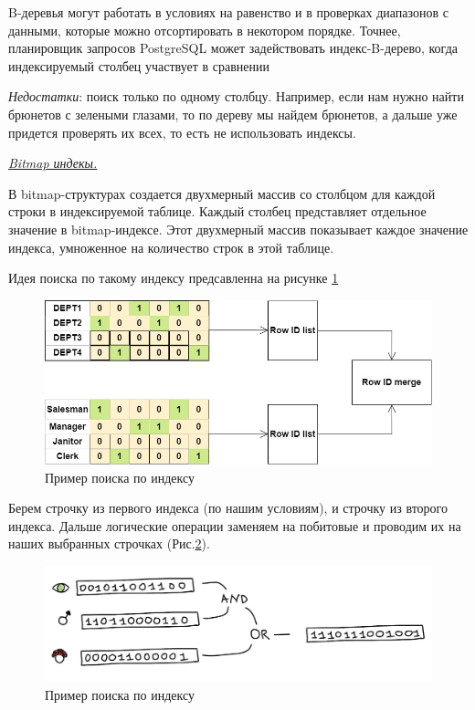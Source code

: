 B-деревья могут работать в условиях на равенство и в проверках диапазонов с данными, которые можно отсортировать в некотором порядке. Точнее, планировщик запросов PostgreSQL может задействовать индекс-B-дерево, когда индексируемый столбец участвует в сравнении 

\textit{Недостатки}: поиск только по одному столбцу. Например, если нам нужно найти брюнетов с зелеными глазами, то по дереву мы найдем брюнетов, а дальше уже придется проверять их всех, то есть не использовать индексы. 


\begin{center}
\textit{\underline{Bitmap индекы.}}
\end{center}

В bitmap-структурах создается двухмерный массив со столбцом для каждой строки в индексируемой таблице. Каждый столбец представляет отдельное значение в bitmap-индексе. Этот двухмерный массив показывает каждое значение индекса, умноженное на количество строк в этой таблице.

Идея поиска по такому индексу предсавленна на рисунке \ref{fig:Map}  

\begin{figure}[!h]
    \centering
    \includegraphics[scale = 0.5]{4/Index.jpg}
    \caption{Пример поиска по индексу}
    \label{fig:Map}
\end{figure}


Берем строчку из первого индекса (по нашим условиям), и строчку из второго индекса. Дальше логические операции заменяем на побитовые и проводим их на наших выбранных строчках (Рис.\ref{fig:BMap}).

\begin{figure}[!h]
    \centering
    \includegraphics[scale = 0.4]{4/BitMat.png}
    \caption{Пример поиска по индексу}
    \label{fig:BMap}
\end{figure}

